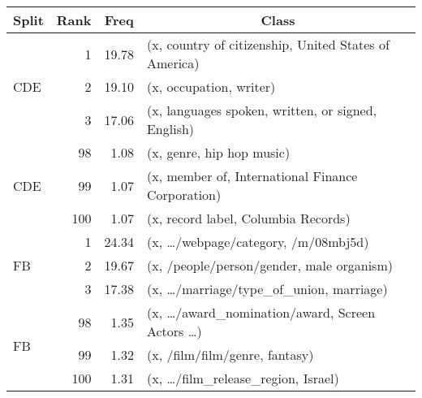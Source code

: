 \begin{tabular}{| l | r | r | l |}
    \hline
    
    \multicolumn{1}{|c|}{\textbf{Split}} &
    \multicolumn{1}{|c|}{\textbf{Rank}} &
    \multicolumn{1}{|c|}{\textbf{Freq}} &
    \multicolumn{1}{|c|}{\textbf{Class}} \\

    \hline \hline

    \multirow{3}{*}{CDE}
    & 1   & 19.78 & (x, country of citizenship, United States of America)   \\
    & 2   & 19.10 & (x, occupation, writer)                                 \\
    & 3   & 17.06 & (x, languages spoken, written, or signed, English)      \\

    \hline

    \multirow{3}{*}{CDE}
    & 98  & 1.08  & (x, genre, hip hop music)                               \\
    & 99  & 1.07  & (x, member of, International Finance Corporation)       \\
    & 100 & 1.07  & (x, record label, Columbia Records)                     \\

    \hline \hline

    \multirow{3}{*}{FB}
    & 1   & 24.34 & (x, \dots/webpage/category, /m/08mbj5d)                 \\
    & 2   & 19.67 & (x, /people/person/gender, male organism)               \\
    & 3   & 17.38 & (x, \dots/marriage/type\_of\_union, marriage)           \\

    \hline

    \multirow{3}{*}{FB}
    & 98  & 1.35  & (x, \dots/award\_nomination/award, Screen Actors \dots) \\
    & 99  & 1.32  & (x, /film/film/genre, fantasy)                          \\
    & 100 & 1.31  & (x, \dots/film\_release\_region, Israel)                \\

    \hline
\end{tabular}
